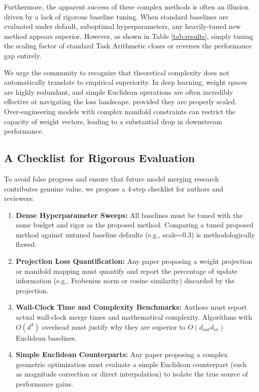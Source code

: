 \documentclass{article}
\begin{document}
Furthermore, the apparent success of these complex methods is often an illusion driven by a lack of rigorous baseline tuning. When standard baselines are evaluated under default, suboptimal hyperparameters, any heavily-tuned new method appears superior. However, as shown in Table \ref{tab:results}, simply tuning the scaling factor of standard Task Arithmetic closes or reverses the performance gap entirely.

We urge the community to recognize that theoretical complexity does not automatically translate to empirical superiority. In deep learning, weight spaces are highly redundant, and simple Euclidean operations are often incredibly effective at navigating the loss landscape, provided they are properly scaled. Over-engineering models with complex manifold constraints can restrict the capacity of weight vectors, leading to a substantial drop in downstream performance.

\subsection{A Checklist for Rigorous Evaluation}
To avoid false progress and ensure that future model merging research contributes genuine value, we propose a 4-step checklist for authors and reviewers:
\begin{enumerate}
\item \textbf{Dense Hyperparameter Sweeps:} All baselines must be tuned with the same budget and rigor as the proposed method. Comparing a tuned proposed method against untuned baseline defaults (e.g., scale=0.3) is methodologically flawed.
\item \textbf{Projection Loss Quantification:} Any paper proposing a weight projection or manifold mapping must quantify and report the percentage of update information (e.g., Frobenius norm or cosine similarity) discarded by the projection.
\item \textbf{Wall-Clock Time and Complexity Benchmarks:} Authors must report actual wall-clock merge times and mathematical complexity. Algorithms with $O(d^3)$ overhead must justify why they are superior to $O(d_{out}d_{in})$ Euclidean baselines.
\item \textbf{Simple Euclidean Counterparts:} Any paper proposing a complex geometric optimization must evaluate a simple Euclidean counterpart (such as magnitude correction or direct interpolation) to isolate the true source of performance gains.
\end{enumerate}
\end{document}
